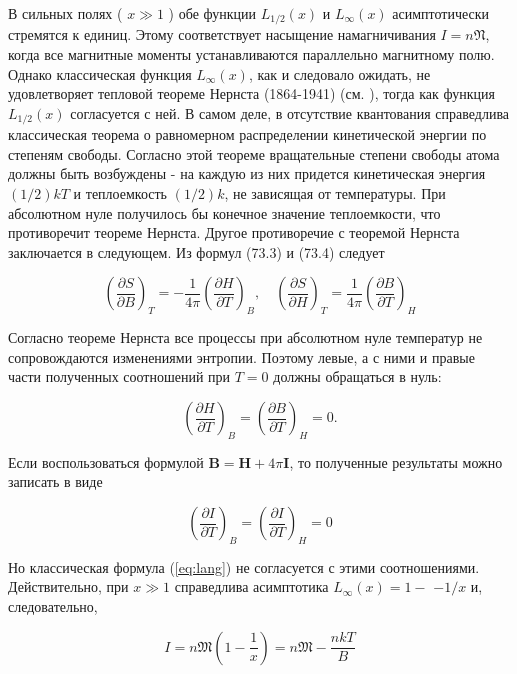 \documentclass[12pt]{article}
\begin{document}
  В сильных полях ( $x \gg 1$ ) обе функции $L_{1 / 2}(x)$ и $L_{\infty}(x)$ асимптотически стремятся к единиц. Этому соответствует насыщение намагничивания $I=n \mathfrak{N}$, когда все магнитные моменты устанавливаются параллельно магнитному полю. Однако классическая функция $L_{\infty}(x)$, как и следовало ожидать, не удовлетворяет тепловой теореме Нернста (1864-1941) (см. \cite{sivykhin2}), тогда как функция $L_{1 / 2}(x)$ согласуется с ней. В самом деле, в отсутствие квантования справедлива классическая теорема о равномерном распределении кинетической энергии по степеням свободы. Согласно этой теореме вращательные степени свободы атома должны быть возбуждены - на каждую из них придется кинетическая энергия $(1 / 2) k T$ и теплоемкость $(1 / 2) k$, не зависящая от температуры. При абсолютном нуле получилось бы конечное значение теплоемкости, что противоречит теореме Нернста. Другое противоречие с теоремой Нернста заключается в следующем. Из формул (73.3) и (73.4) следует

  \begin{equation}
  \left(\frac{\partial S}{\partial B}\right)_T=-\frac{1}{4 \pi}\left(\frac{\partial H}{\partial T}\right)_B, \quad\left(\frac{\partial S}{\partial H}\right)_T=\frac{1}{4 \pi}\left(\frac{\partial B}{\partial T}\right)_H
  \end{equation}

  Согласно теореме Нернста все процессы при абсолютном нуле температур не сопровождаются изменениями энтропии. Поэтому левые, а с ними и правые части полученных соотношений при $T=0$ должны обращаться в нуль:

  \begin{equation}
  \left(\frac{\partial H}{\partial T}\right)_B=\left(\frac{\partial B}{\partial T}\right)_H=0 .
  \end{equation}

  Если воспользоваться формулой $\mathbf{B}=\mathbf{H}+4 \pi \mathbf{I}$, то полученные результаты можно записать в виде

  \begin{equation}
  \left(\frac{\partial I}{\partial T}\right)_B=\left(\frac{\partial I}{\partial T}\right)_H=0
  \end{equation}

  Но классическая формула (\ref{eq:lang}) не согласуется с этими соотношениями. Действительно, при $x \gg 1$ справедлива асимптотика $L_{\infty}(x)=1-$ $-1 / x$ и, следовательно,

  \begin{equation}
  I=n \mathfrak{M}\left(1-\frac{1}{x}\right)=n \mathfrak{M}-\frac{n k T}{B}
  \end{equation}
\end{document}
